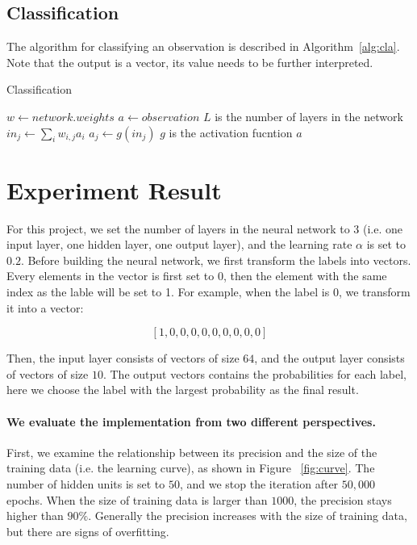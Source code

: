 \documentclass{article}
\begin{document}
\subsection{Classification}

The algorithm for classifying an observation is described in Algorithm~\ref{alg:cla}. Note that the output is a vector, its value needs to be further interpreted.

\begin{algorithm}[H]
\centering
\caption{Classification}
\label{alg:cla}
  \begin{algorithmic}[1]
    	\State $w \gets network.weights$
    	\State $a \gets observation$
    	  \Comment $L$ is the number of layers in the network
    			\State $in_j \gets \sum_i w_{i,j}a_i$
    			\State $a_j \gets g(in_j)$  \Comment $g$ is the activation fucntion
    		\EndFor
    	\EndFor
    	\State \Return $a$
    \EndFunction
  \end{algorithmic}
\end{algorithm}

\section{Experiment Result}

For this project, we set the number of layers in the neural network to $3$ (i.e. one input layer, one hidden layer, one output layer), and the learning rate $\alpha$ is set to $0.2$. Before building the neural network, we first transform the labels into vectors. Every elements in the vector is first set to 0, then the element with the same index as the lable will be set to 1. For example, when the label is $0$, we transform it into a vector:

$$[1, 0, 0, 0, 0, 0, 0, 0, 0, 0]$$

Then, the input layer consists of vectors of size $64$, and the output layer consists of vectors of size $10$. The output vectors contains the probabilities for each label, here we choose the label with the largest probability as the final result.

\paragraph{We evaluate the implementation from two different perspectives.} First, we examine the relationship between its precision and the size of the training data (i.e. the learning curve), as shown in Figure ~\ref{fig:curve}. The number of hidden units is set to $50$, and we stop the iteration after $50,000$ epochs. When the size of training data is larger than $1000$, the precision stays higher than $90\%$. Generally the precision increases with the size of training data, but there are signs of overfitting.
\end{document}
